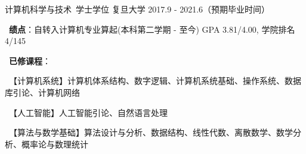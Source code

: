 

\begin{cventries}

  \cventry
    {计算机科学与技术\ 学士学位} %
    {复旦大学} %
    {2017.9 - 2021.6（预期毕业时间）} %
    {} %
    {
      \begin{cvitems} %
        \item {\bullet\ \textbf{绩点}：自转入计算机专业算起(本科第二学期 - 至今) GPA 3.81/4.00, 学院排名 4/145} %
        \item {\bullet\ \textbf{已修课程}：}
        \item {\quad\ 【计算机系统】计算机体系结构、数字逻辑、计算机系统基础、操作系统、数据库引论、计算机网络}
        \item {\quad\ 【人工智能】人工智能引论、自然语言处理}
        \item {\quad\ 【算法与数学基础】算法设计与分析、数据结构、线性代数、离散数学、数学分析、概率论与数理统计}
			\end{cvitems}
    }

\end{cventries}